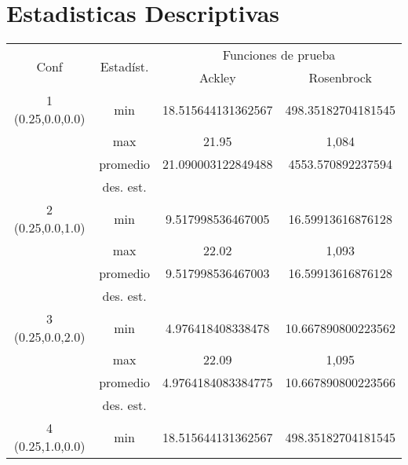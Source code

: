 \documentclass{report}
\begin{document}
    \section{Estadisticas Descriptivas}
    \begin{table}[H]
        \centering
        \begin{tabular}{|c|c|c|c|}
        \hline
        \multirow{2}{*}{Conf} & \multirow{2}{*}{Estadíst.} & \multicolumn{2}{c|}{Funciones de prueba} \\ \cline{3-4} 
                              &                             & Ackley & Rosenbrock \\ \hline
        1 (0.25,0.0,0.0)                    & min                         & 18.515644131362567 & 498.35182704181545 \\ \cline{2-4} 
                              & max                         &     21.95       &    1,084   \\ \cline{2-4} 
                              & promedio                    &      21.090003122849488      &    4553.570892237594    \\ \cline{2-4} 
                              & des. est.                   &            &        \\ \hline
        2 (0.25,0.0,1.0)                    & min                         &     9.517998536467005   & 16.59913616876128    \\ \cline{2-4}
                              & max                         &  22.02   &    1,093    \\ \cline{2-4}
                              & promedio                    &    9.517998536467003    &  16.59913616876128   \\ \cline{2-4}
                              & des. est.                   &            &        \\ \hline
        3 (0.25,0.0,2.0)                    & min                         &      4.976418408338478      &     10.667890800223562   \\ \cline{2-4} 
                              & max                         &     22.09       &     1,095   \\ \cline{2-4} 
                              & promedio                    &      4.9764184083384775      &    10.667890800223566    \\ \cline{2-4} 
                              & des. est.                   &            &        \\ \hline
        4 (0.25,1.0,0.0)                    & min                         &      18.515644131362567      &    498.35182704181545    \\ \cline{2-4} 

\end{tabular}
\end{table}
\end{document}
